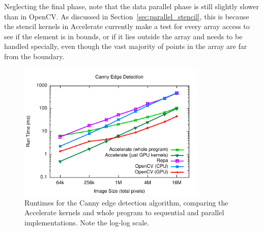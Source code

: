Neglecting the final phase, note that the data parallel phase is still slightly
slower than in OpenCV. As discussed in Section~\ref{sec:parallel_stencil}, this
is because the stencil kernels in Accelerate currently make a test for every
array access to see if the element is in bounds, or if it lies outside the array
and needs to be handled specially, even though the vast majority of points in
the array are far from the boundary.

\begin{figure}
    \begin{center}
        \includegraphics[width=0.8\textwidth]{images/sec-6/canny/canny}
    \end{center}
    \caption[Canny edge detection benchmarks]{Runtimes for the Canny edge
        detection algorithm, comparing the Accelerate kernels and whole program
        to sequential and parallel implementations. Note the log-log scale.}
    \label{fig:canny}
\end{figure}

